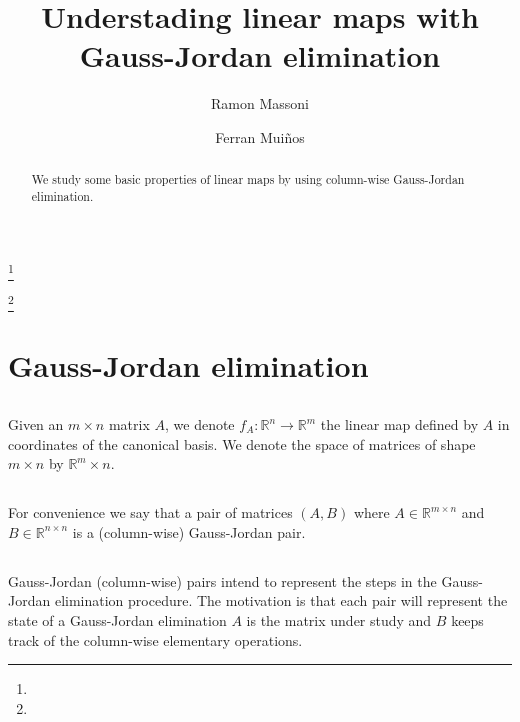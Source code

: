 \documentclass{proc-l}
\theoremstyle{definition}
\theoremstyle{remark}
\numberwithin{equation}{section}
\newcommand{\R}{\mathbb{R}}
\begin{document}
\title{Understading linear maps with Gauss-Jordan elimination}


\author{Ramon Massoni}
\address{}
\curraddr{}
\email{}
\thanks{}

\author{Ferran Mui\~nos}
\address{}
\curraddr{}
\email{}
\thanks{}





\begin{abstract}
We study some basic properties of linear maps by using column-wise Gauss-Jordan elimination.
\end{abstract}

\maketitle

\section{Gauss-Jordan elimination}
\subsection{}
Given an $m\times n$ matrix $A$, we denote $f_A:\R^n\to\R^m$ the linear map defined by $A$ in coordinates of the canonical basis. We denote the space of matrices of shape $m\times n$ by $\R^m\times n$.

\subsection{}
For convenience we say that a pair of matrices $(A, B)$ where $A\in\R^{m\times n}$ and $B\in\R^{n\times n}$ is a (column-wise) Gauss-Jordan pair.

\subsection{}
Gauss-Jordan (column-wise) pairs intend to represent the steps in the Gauss-Jordan elimination procedure. The motivation is that each pair will represent the state of a Gauss-Jordan elimination $A$ is the matrix under study and $B$ keeps track of the column-wise elementary operations.
\end{document}
